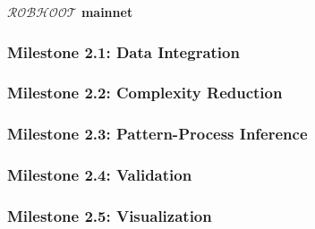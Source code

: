 \documentclass[english,12pt]{article}
\begin{document}

\begin{mybox}\begin{singlespace}
 {\bf{$\mathcal{ROBHOOT}$ mainnet}}\\
 \begin{small}
\subsubsection{Milestone 2.1: Data Integration}

\subsubsection{Milestone 2.2: Complexity Reduction}

\subsubsection{Milestone 2.3: Pattern-Process Inference}
  
\subsubsection{Milestone 2.4: Validation}

\subsubsection{Milestone 2.5: Visualization}

\end{small}
\end{singlespace}
\end{mybox}






\newpage



\newpage
\end{document}
